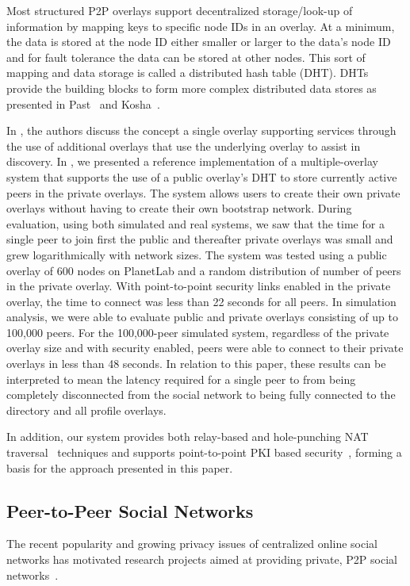 \documentclass[letterpaper,twocolumn,10pt]{article}
\begin{document}
Most structured P2P overlays support decentralized storage/look-up of information by
mapping keys to specific node IDs in an overlay.  At a minimum, the data is stored
at the node ID either smaller or larger to the data's node ID and for fault
tolerance the data can be stored at other nodes.  This sort of mapping
and data storage is called a distributed hash table (DHT).  DHTs provide the
building blocks to form more complex distributed data stores as presented in
Past~\cite{past} and Kosha~\cite{kosha}.

In \cite{one_ring, can_multicast}, the authors discuss the concept a
single overlay supporting services through the use of additional overlays
that use the underlying overlay to assist in discovery.  In \cite{icdcs10}, we
presented a reference implementation of a multiple-overlay system that supports
the use of a public overlay's DHT to store currently active peers in the private
overlays. The system allows users to create their own private overlays without
having to create their own bootstrap network.  During evaluation, using both
simulated and real systems, we saw that the time for a single peer to join first the public
and thereafter private overlays was small and grew logarithmically with network
sizes.  The system was tested using a public overlay of 600 nodes on PlanetLab and a random distribution of number of peers in the private overlay.
With point-to-point security links enabled in the private overlay, the time to
connect was less than 22 seconds for all peers. In simulation analysis, we were able to evaluate public
and private overlays consisting of up to 100,000 peers.  For the 100,000-peer simulated system, regardless of the private
overlay size and with security enabled, peers were able to connect to their private overlays in less than 48 seconds.  
In relation to this paper, these results can be interpreted to mean the latency
required for a single peer to from being completely disconnected from the social network
to being fully connected to the directory and all profile overlays.

In addition, our system provides both relay-based and hole-punching NAT
traversal~\cite{nsdi10} techniques and supports point-to-point
PKI based security~\cite{icdcs10}, forming a basis for the approach
presented in this paper.

\subsection{Peer-to-Peer Social Networks}
The recent popularity and growing privacy issues of centralized online social
networks has motivated research projects aimed at providing private, P2P social
networks~\cite{peerson, matryoshka, tribler-osn, vis-a-vis}.
\end{document}
